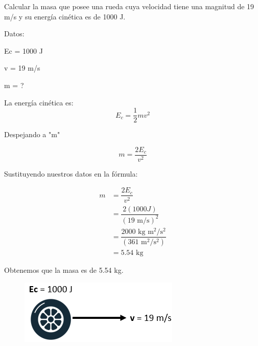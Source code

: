 Calcular la masa que posee una rueda cuya velocidad tiene una magnitud de 19 m/s y su energía cinética es de 1000 J.

\begin{minipage}{0.65\textwidth}
    \begin{solutionbox}{8cm}
        \begin{multicols}{2}
            Datos:

            Ec = 1000 J

            v = 19 m/s

            m = ?

            La energía cinética es:
            \[E_c=\frac{1}{2}mv^2\]

            Despejando a "m"

            \[m=\dfrac{2E_c}{v^2}\]

            \vspace{2cm}

            Sustituyendo nuestros datos en la fórmula:

            \[
                \begin{array}{rl}
                    m & =\dfrac{2E_c}{v^2}                                              \\[1em]
                      & =\dfrac{2(1000J)}{(19 \text{ m/s})^2}                           \\[1em]
                      & =\dfrac{2000 \text{ kg m$^2$/s$^2$}}{(361 \text{ m$^2$/s$^2$})} \\[1em]
                      & =5.54 \text{ kg}
                \end{array}
            \]






        \end{multicols}
        \begin{center} Obtenemos que la masa es de 5.54 kg.\end{center}
    \end{solutionbox}
\end{minipage}\hfill
\begin{minipage}{0.3\textwidth}
    \begin{figure}[H]
        \includegraphics[width=\linewidth]{../images/energia_cinetica_problema_3.png}
    \end{figure}
\end{minipage}